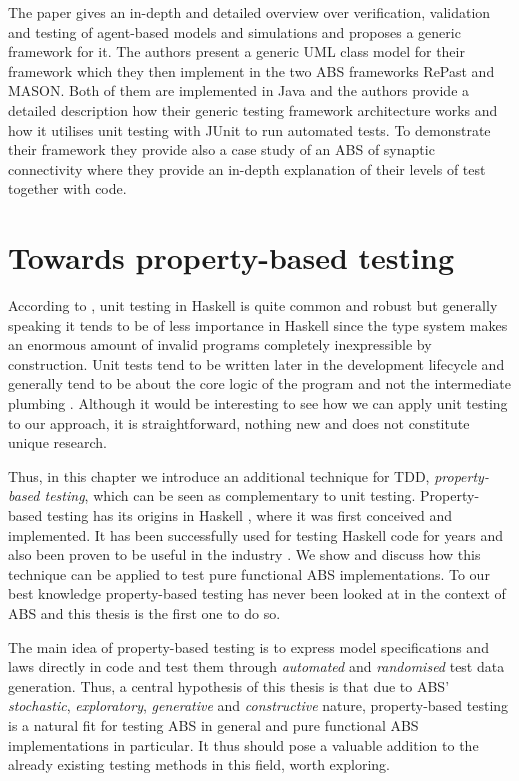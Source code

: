 The paper \cite{gurcan_generic_2013} gives an in-depth and detailed overview over verification, validation and testing of agent-based models and simulations and proposes a generic framework for it. The authors present a generic UML class model for their framework which they then implement in the two ABS frameworks RePast and MASON. Both of them are implemented in Java and the authors provide a detailed description how their generic testing framework architecture works and how it utilises unit testing with JUnit to run automated tests. To demonstrate their framework they provide also a case study of an ABS of synaptic connectivity where they provide an in-depth explanation of their levels of test together with code.

\section*{Towards property-based testing}
According to \cite{diehl_what_nodate}, unit testing in Haskell is quite common and robust but generally speaking it tends to be of less importance in Haskell since the type system makes an enormous amount of invalid programs completely inexpressible by construction. Unit tests tend to be written later in the development lifecycle and generally tend to be about the core logic of the program and not the intermediate plumbing \cite{diehl_what_nodate}. Although it would be interesting to see how we can apply unit testing to our approach, it is straightforward, nothing new and does not constitute unique research. 

Thus, in this chapter we introduce an additional technique for TDD, \textit{property-based testing}, which can be seen as complementary to unit testing. Property-based testing has its origins in Haskell \cite{claessen_quickcheck_2000,claessen_testing_2002,runciman_smallcheck_2008}, where it was first conceived and implemented. It has been successfully used for testing Haskell code for years and also been proven to be useful in the industry \cite{hughes_quickcheck_2007}. We show and discuss how this technique can be applied to test pure functional ABS implementations. To our best knowledge property-based testing has never been looked at in the context of ABS and this thesis is the first one to do so.

\medskip

The main idea of property-based testing is to express model specifications and laws directly in code and test them through \textit{automated} and \textit{randomised} test data generation. Thus, a central hypothesis of this thesis is that due to ABS' \textit{stochastic}, \textit{exploratory}, \textit{generative} and \textit{constructive} nature, property-based testing is a natural fit for testing ABS in general and pure functional ABS implementations in particular. It thus should pose a valuable addition to the already existing testing methods in this field, worth exploring.

